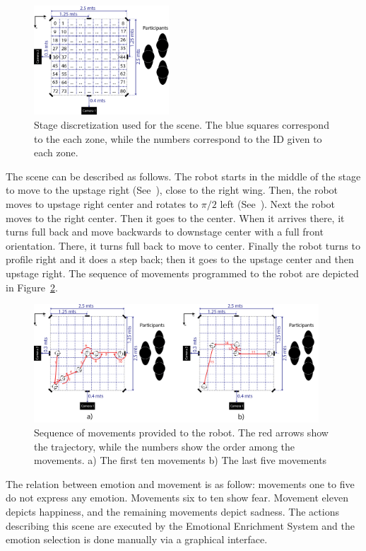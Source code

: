 \begin{figure}
	\centering
	\includegraphics[width=0.45\textwidth]{./Images/FourthCaseScene.png} 
	\caption{Stage discretization  used for the scene. The blue squares correspond to the each zone, while the numbers correspond to the ID given to each zone.}
	\label{fig:stage_division}
\end{figure} 

The scene can be described as follows. The robot starts in the middle of the stage to move to the upstage right (See~\cite{Musical}), close to the right wing. Then, the robot moves to upstage right center and rotates to $\pi/2$ left (See~\cite{Artopia}). Next the robot moves to the right center. Then it goes to the center. When it arrives there, it turns full back and move backwards to downstage center with a full front orientation. There, it turns full back to move to center. Finally the robot turns to profile right and it does a step back; then it goes to the upstage center and then upstage right. The sequence of movements programmed to the robot are depicted in Figure~\ref{fig:movement}.
\begin{figure}
	\centering
	\includegraphics[width=0.95\textwidth]{./Images/fourthCaseSceneD.png} 
	\caption{Sequence of movements provided to the robot. The red arrows show the trajectory, while the numbers show the order among the movements. a) The first ten movements b) The last five movements }
	\label{fig:movement}
\end{figure}

The relation between emotion and movement is as follow: movements one to five do not express any emotion. Movements six to ten show fear. Movement eleven depicts happiness, and the remaining movements depict sadness. The actions describing this scene are executed by the Emotional Enrichment System and the emotion selection is done manually via a graphical interface.

